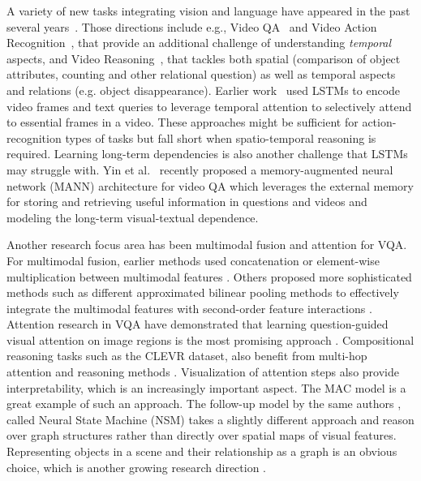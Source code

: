 A variety of new tasks integrating vision and language have appeared in the past several years~\cite{mogadala2019trends}.
Those directions include e.g., Video QA~\cite{MovieQA} and Video Action Recognition~\cite{monfort2019moments}, that provide an additional challenge of understanding \emph{temporal} aspects, and Video Reasoning~\cite{song2018explore,yang2018dataset}, that tackles both spatial (comparison of object attributes, counting and other relational question) as well as temporal aspects and relations (e.g. object disappearance).
Earlier work~\cite{mun2017marioqa, xu2017video, yu2017end} used LSTMs to encode video frames and text queries to leverage temporal attention to selectively attend to essential frames in a video. These approaches might be sufficient for action-recognition types of tasks but fall short when spatio-temporal reasoning is required.  Learning long-term dependencies is also another challenge that LSTMs may struggle with. Yin et al.~\cite{yin2019memory} recently proposed a memory-augmented neural network (MANN) architecture for video QA which leverages the external memory for storing and retrieving useful information in questions and videos and modeling the long-term visual-textual dependence.

Another research focus area has been multimodal fusion and attention for VQA. For multimodal fusion, earlier methods used concatenation or element-wise multiplication between multimodal features \cite{zhou2015simple, antol2015}.  Others proposed more sophisticated methods such as different approximated bilinear pooling methods to effectively integrate the multimodal features with second-order feature interactions \cite{fukui2016multimodal, kim2016hadamard}.  Attention  research in VQA have demonstrated that learning question-guided visual attention on image regions is the most promising approach \cite{yang2016stacked, chen2015abc, ilievski2016focused}.   Compositional reasoning tasks such as the CLEVR dataset, also benefit from multi-hop attention and reasoning methods \cite{hudson2018compositional, song2018explore}.   Visualization of attention steps also provide interpretability, which is an increasingly important aspect. The MAC model \cite{hudson2018compositional} is a great example of such an approach.  The follow-up model by the same authors  \cite{hudson2019learning}, called Neural State Machine (NSM) takes a slightly different approach and reason over graph structures rather than directly over spatial maps of visual features.  Representing objects in a scene and their relationship as a graph is an obvious choice, which is another growing research direction \cite{haurilet2019s, teney2017graph, kim2018dynamic}. 

